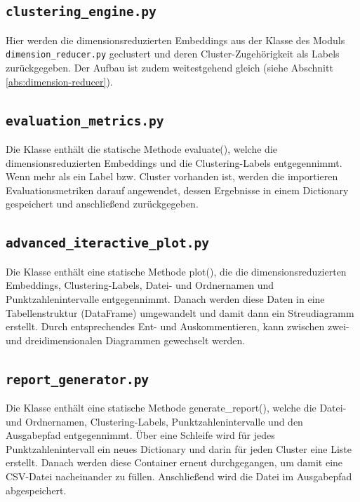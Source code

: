\subsection{\texttt{clustering\_engine.py}}
\label{abs:clustering-engine}
Hier werden die dimensionsreduzierten Embeddings aus der Klasse des Moduls \texttt{dimension\_reducer.py} geclustert und deren Cluster-Zugehörigkeit als Labels zurückgegeben. Der Aufbau ist zudem weitestgehend gleich (siehe Abschnitt \ref{abs:dimension-reducer}).


\subsection{\texttt{evaluation\_metrics.py}}
\label{abs:evaluation-metrics}
Die Klasse enthält die statische Methode evaluate(), welche die dimensionsreduzierten Embeddings und die Clustering-Labels entgegennimmt. Wenn mehr als ein Label bzw. Cluster vorhanden ist, werden die importieren Evaluationsmetriken darauf angewendet, dessen Ergebnisse in einem Dictionary gespeichert und anschließend zurückgegeben.


\subsection{\texttt{advanced\_iteractive\_plot.py}}
\label{abs:advanced-interactive-plot}
Die Klasse enthält eine statische Methode plot(), die die dimensionsreduzierten Embeddings, Clustering-Labels, Datei- und Ordnernamen und Punktzahlenintervalle entgegennimmt. Danach werden diese Daten in eine Tabellenstruktur (DataFrame) umgewandelt und damit dann ein Streudiagramm erstellt. Durch entsprechendes Ent- und Auskommentieren, kann zwischen zwei- und dreidimensionalen Diagrammen gewechselt werden.


\subsection{\texttt{report\_generator.py}}
\label{abs:report-generator}
Die Klasse enthält eine statische Methode generate\_report(), welche die Datei- und Ordnernamen, Clustering-Labels, Punktzahlenintervalle und den Ausgabepfad entgegennimmt. Über eine Schleife wird für jedes Punktzahlenintervall ein neues Dictionary und darin für jeden Cluster eine Liste erstellt. Danach werden diese Container erneut durchgegangen, um damit eine CSV-Datei nacheinander zu füllen. Anschließend wird die Datei im Ausgabepfad abgespeichert.